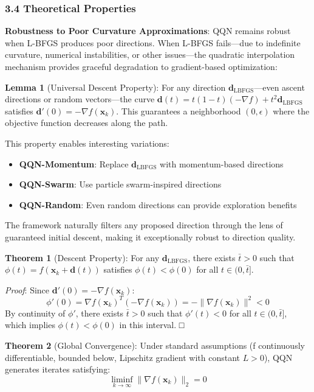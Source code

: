 \hypertarget{theoretical-properties}{%
\subsubsection{3.4 Theoretical Properties}\label{theoretical-properties}}

\textbf{Robustness to Poor Curvature Approximations}: QQN remains robust when L-BFGS produces poor directions. When L-BFGS
fails---due to indefinite curvature, numerical instabilities, or other issues---the quadratic interpolation mechanism
provides graceful degradation to gradient-based optimization:

\textbf{Lemma 1} (Universal Descent Property): For any direction \(\mathbf{d}_{\text{LBFGS}}\)---even ascent directions or
random vectors---the curve \(\mathbf{d}(t) = t(1-t)(-\nabla f) + t^2 \mathbf{d}_{\text{LBFGS}}\) satisfies
\(\mathbf{d}'(0) = -\nabla f(\mathbf{x}_k)\). This guarantees a neighborhood \((0, \epsilon)\) where the objective
function decreases along the path.

This property enables interesting variations:

\begin{itemize}
\tightlist
\item
  \textbf{QQN-Momentum}: Replace \(\mathbf{d}_{\text{LBFGS}}\) with momentum-based directions
\item
  \textbf{QQN-Swarm}: Use particle swarm-inspired directions
\item
  \textbf{QQN-Random}: Even random directions can provide exploration benefits
\end{itemize}

The framework naturally filters any proposed direction through the lens of guaranteed initial descent, making it
exceptionally robust to direction quality.

\textbf{Theorem 1} (Descent Property): For any \(\mathbf{d}_{\text{LBFGS}}\), there exists \(\bar{t} > 0\) such
that \(\phi(t) = f(\mathbf{x}_k + \mathbf{d}(t))\) satisfies \(\phi(t) < \phi(0)\) for all \(t \in (0, \bar{t}]\).

\emph{Proof}: Since \(\mathbf{d}'(0) = -\nabla f(\mathbf{x}_k)\):
\[\phi'(0) = \nabla f(\mathbf{x}_k)^T (-\nabla f(\mathbf{x}_k)) = -\|\nabla f(\mathbf{x}_k)\|^2 < 0\]
By continuity of \(\phi'\), there exists \(\bar{t} > 0\) such that \(\phi'(t) < 0\) for all \(t \in (0, \bar{t}]\), which
implies \(\phi(t) < \phi(0)\) in this interval. □

\textbf{Theorem 2} (Global Convergence): Under standard assumptions (f continuously differentiable, bounded below, Lipschitz
gradient with constant \(L > 0\)), QQN generates iterates satisfying:
\[\liminf_{k \to \infty} \|\nabla f(\mathbf{x}_k)\|_2 = 0\]

